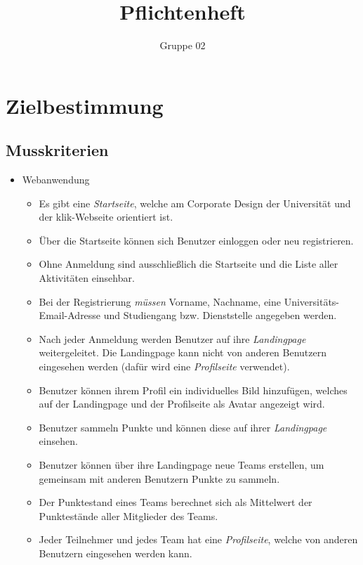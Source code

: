 \documentclass[10pt,a4paper]{article}
\author{Gruppe 02}
\title{Pflichtenheft}
\begin{document}
\maketitle
\newpage
\tableofcontents
\newpage
\section{Zielbestimmung}
	\subsection{Musskriterien}
	\begin{itemize}
		\item Webanwendung
		\begin{itemize}
			\item Es gibt eine \emph{Startseite}, welche am Corporate Design der Universität und der klik-Webseite orientiert ist.
                        \item Über die Startseite können sich Benutzer einloggen oder neu registrieren.
			\item Ohne Anmeldung sind ausschließlich die Startseite und die Liste aller Aktivitäten einsehbar.
			\item Bei der Registrierung \emph{müssen} Vorname, Nachname, eine Universitäts-Email-Adresse und Studiengang bzw. Dienststelle angegeben werden.
                        \item Nach jeder Anmeldung werden Benutzer auf ihre \emph{Landingpage} weitergeleitet. Die Landingpage kann nicht von anderen Benutzern  eingesehen werden (dafür wird eine \emph{Profilseite} verwendet).
                        \item Benutzer können ihrem Profil ein individuelles Bild hinzufügen, welches auf der Landingpage und der Profilseite als Avatar angezeigt wird.
                        \item Benutzer sammeln Punkte und können diese auf ihrer \emph{Landingpage} einsehen. 
                        \item Benutzer können über ihre Landingpage neue Teams erstellen, um gemeinsam mit anderen Benutzern Punkte zu sammeln.
                        \item Der Punktestand eines Teams berechnet sich als Mittelwert der Punktestände aller Mitglieder des Teams.
                        \item Jeder Teilnehmer und jedes Team hat eine \emph{Profilseite}, welche von anderen Benutzern eingesehen werden kann.

\end{itemize}
\end{itemize}
\end{document}
